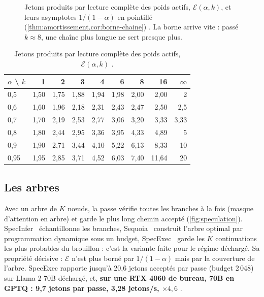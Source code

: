 \begin{figure}[ht]
\centering
\GrapheAmortissement
\caption[Jetons produits par lecture des poids, $\mathcal E(\alpha,k)$]{Jetons produits par lecture complète des poids actifs, $\mathcal E(\alpha, k)$, et leurs asymptotes $1/(1-\alpha)$ en pointillé (\cref{thm:amortissement,cor:borne-chaine}) \calc. La borne arrive vite : passé $k \approx 8$, une chaîne plus longue ne sert presque plus.}
\label{fig:amortissement}
\end{figure}

\begin{table}[ht]
\centering\small
\caption[Valeurs de $\mathcal E(\alpha,k)$]{Jetons produits par lecture complète des poids actifs, $\mathcal E(\alpha,k)$ \calc.}
\label{tab:amortissement}
\begin{tabular}{@{}lrrrrrrrr@{}}
\toprule
$\alpha$ \textbackslash{} $k$ & 1 & 2 & 3 & 4 & 6 & 8 & 16 & $\infty$ \\
\midrule
0,5 & 1,50 & 1,75 & 1,88 & 1,94 & 1,98 & 2,00 & 2,00 & 2 \\
0,6 & 1,60 & 1,96 & 2,18 & 2,31 & 2,43 & 2,47 & 2,50 & 2,5 \\
0,7 & 1,70 & 2,19 & 2,53 & 2,77 & 3,06 & 3,20 & 3,33 & 3,33 \\
0,8 & 1,80 & 2,44 & 2,95 & 3,36 & 3,95 & 4,33 & 4,89 & 5 \\
0,9 & 1,90 & 2,71 & 3,44 & 4,10 & 5,22 & 6,13 & 8,33 & 10 \\
0,95 & 1,95 & 2,85 & 3,71 & 4,52 & 6,03 & 7,40 & 11,64 & 20 \\
\bottomrule
\end{tabular}
\end{table}

\subsection{Les arbres}

Avec un arbre de $K$ nœuds, la passe vérifie toutes les branches à la fois (masque d'attention en arbre) et garde le plus long chemin accepté (\cref{fig:speculation}). SpecInfer~\cite{specinfer2023} échantillonne les branches, Sequoia~\cite{sequoia2024} construit l'arbre optimal par programmation dynamique sous un budget, SpecExec~\cite{specexec2024} garde les $K$ continuations les plus probables du brouillon : c'est la variante faite pour le régime déchargé. Sa propriété décisive : $\mathcal E$ n'est plus borné par $1/(1-\alpha)$ mais par la couverture de l'arbre. SpecExec rapporte jusqu'à 20,6 jetons acceptés par passe (budget 2\,048) sur Llama 2 70B déchargé, et, \textbf{sur une RTX 4060 de bureau, 70B en GPTQ : 9,7 jetons par passe, 3,28 jetons/s, $\times 4{,}6$} \litt.

